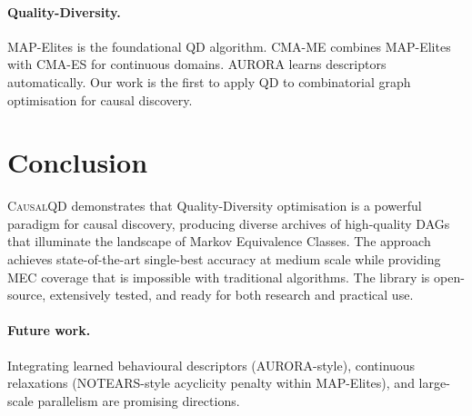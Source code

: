 \documentclass[11pt,a4paper]{article}
\begin{document}
\paragraph{Quality-Diversity.}
MAP-Elites \citep{mouret2015illuminating} is the foundational QD algorithm. CMA-ME \citep{fontaine2020covariance} combines MAP-Elites with CMA-ES for continuous domains. AURORA \citep{grillotti2022unsupervised} learns descriptors automatically. Our work is the first to apply QD to combinatorial graph optimisation for causal discovery.

\section{Conclusion}

\textsc{CausalQD} demonstrates that Quality-Diversity optimisation is a powerful paradigm for causal discovery, producing diverse archives of high-quality DAGs that illuminate the landscape of Markov Equivalence Classes. The approach achieves state-of-the-art single-best accuracy at medium scale while providing MEC coverage that is impossible with traditional algorithms. The library is open-source, extensively tested, and ready for both research and practical use.

\paragraph{Future work.} Integrating learned behavioural descriptors (AURORA-style), continuous relaxations (NOTEARS-style acyclicity penalty within MAP-Elites), and large-scale parallelism are promising directions.


\end{document}
